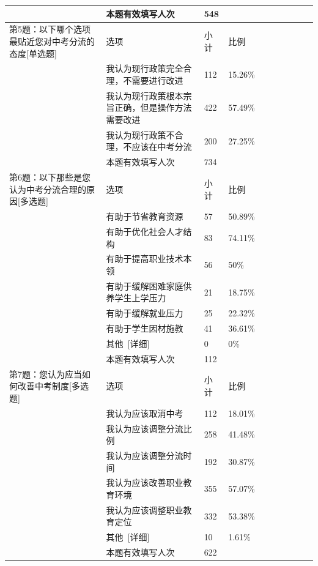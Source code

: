 \documentclass[12pt,UTF8]{ctexart}
\begin{document}
{\begin{spacing}{01}
\begin{longtable}{p{3.5cm}p{2cm}p{1.5cm}p{1.5cm}p{1.5cm}p{1.5cm}p{1.5cm}p{1cm}}
			~ & 本题有效填写人次 & 548 & ~ & ~ & ~ & ~ & ~ \\ \hline
			第5题：以下哪个选项最贴近您对中考分流的态度[单选题] & 选项 & 小计 & 比例 & ~ & ~ & ~ & ~ \\ \hline
			~ & 我认为现行政策完全合理，不需要进行改进 & 112 & 15.26\% & ~ & ~ & ~ & ~ \\ \hline
			~ & 我认为现行政策根本宗旨正确，但是操作方法需要改进 & 422 & 57.49\% & ~ & ~ & ~ & ~ \\ \hline
			~ & 我认为现行政策不合理，不应该在中考分流 & 200 & 27.25\% & ~ & ~ & ~ & ~ \\ \hline
			~ & 本题有效填写人次 & 734 & ~ & ~ & ~ & ~ & ~ \\ \hline
			第6题：以下那些是您认为中考分流合理的原因[多选题] & 选项 & 小计 & 比例 & ~ & ~ & ~ & ~ \\ \hline
			~ & 有助于节省教育资源 & 57 & 50.89\% & ~ & ~ & ~ & ~ \\ \hline
			~ & 有助于优化社会人才结构 & 83 & 74.11\% & ~ & ~ & ~ & ~ \\ \hline
			~ & 有助于提高职业技术本领 & 56 & 50\% & ~ & ~ & ~ & ~ \\ \hline
			~ & 有助于缓解困难家庭供养学生上学压力 & 21 & 18.75\% & ~ & ~ & ~ & ~ \\ \hline
			~ & 有助于缓解就业压力 & 25 & 22.32\% & ~ & ~ & ~ & ~ \\ \hline
			~ & 有助于学生因材施教 & 41 & 36.61\% & ~ & ~ & ~ & ~ \\ \hline
			~ & 其他 [详细] & 0 & 0\% & ~ & ~ & ~ & ~ \\ \hline
			~ & 本题有效填写人次 & 112 & ~ & ~ & ~ & ~ & ~ \\ \hline
			第7题：您认为应当如何改善中考制度[多选题] & 选项 & 小计 & 比例 & ~ & ~ & ~ & ~ \\ \hline
			~ & 我认为应该取消中考 & 112 & 18.01\% & ~ & ~ & ~ & ~ \\ \hline
			~ & 我认为应该调整分流比例 & 258 & 41.48\% & ~ & ~ & ~ & ~ \\ \hline
			~ & 我认为应该调整分流时间 & 192 & 30.87\% & ~ & ~ & ~ & ~ \\ \hline
			~ & 我认为应该改善职业教育环境 & 355 & 57.07\% & ~ & ~ & ~ & ~ \\ \hline
			~ & 我认为应该调整职业教育定位 & 332 & 53.38\% & ~ & ~ & ~ & ~ \\ \hline
			~ & 其他 [详细] & 10 & 1.61\% & ~ & ~ & ~ & ~ \\ \hline
			~ & 本题有效填写人次 & 622 & ~ & ~ & ~ & ~ & ~ \\ \hline

\end{longtable}
\end{spacing}}
\end{document}
